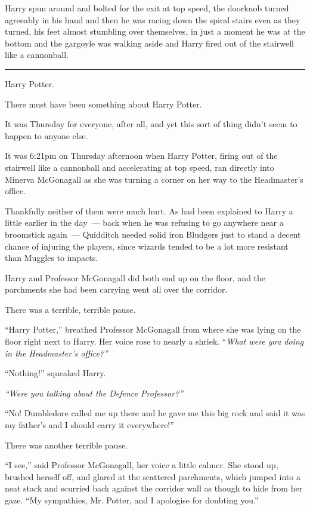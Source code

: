 Harry spun around and bolted for the exit at top speed, the doorknob turned agreeably in his hand and then he was racing down the spiral stairs even as they turned, his feet almost stumbling over themselves, in just a moment he was at the bottom and the gargoyle was walking aside and Harry fired out of the stairwell like a cannonball.

\begin{center}\rule{3in}{0.4pt}\end{center}

Harry Potter.

There must have been something about Harry Potter.

It was Thursday for everyone, after all, and yet this sort of thing didn't seem to happen to anyone else.

It was 6:21pm on Thursday afternoon when Harry Potter, firing out of the stairwell like a cannonball and accelerating at top speed, ran directly into Minerva McGonagall as she was turning a corner on her way to the Headmaster's office.

Thankfully neither of them were much hurt. As had been explained to Harry a little earlier in the day~--- back when he was refusing to go anywhere near a broomstick again~--- Quidditch needed solid iron Bludgers just to stand a decent chance of injuring the players, since wizards tended to be a lot more resistant than Muggles to impacts.

Harry and Professor McGonagall did both end up on the floor, and the parchments she had been carrying went all over the corridor.

There was a terrible, terrible pause.

``Harry Potter,'' breathed Professor McGonagall from where she was lying on the floor right next to Harry. Her voice rose to nearly a shriek. ``\emph{What were you doing in the Headmaster's office?''}

``Nothing!'' squeaked Harry.

\emph{``Were you talking about the Defence Professor?''}

``No! Dumbledore called me up there and he gave me this big rock and said it was my father's and I should carry it everywhere!''

There was another terrible pause.

``I see,'' said Professor McGonagall, her voice a little calmer. She stood up, brushed herself off, and glared at the scattered parchments, which jumped into a neat stack and scurried back against the corridor wall as though to hide from her gaze. ``My sympathies, Mr. Potter, and I apologise for doubting you.''

